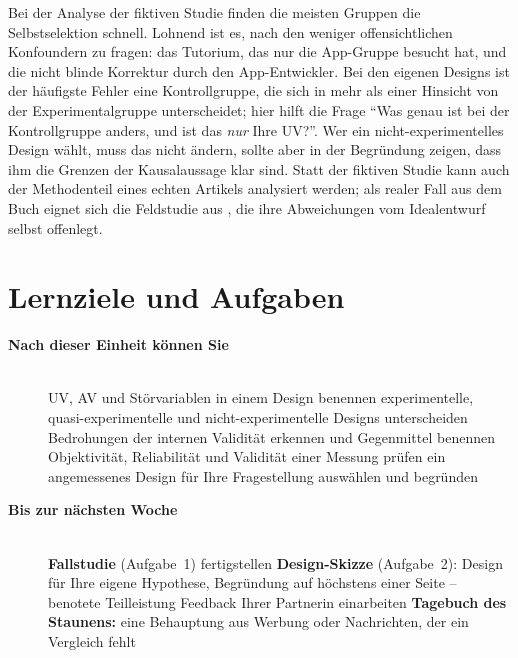 \begin{lehrhinweis}
Bei der Analyse der fiktiven Studie finden die meisten Gruppen die
Selbstselektion schnell. Lohnend ist es, nach den weniger offensichtlichen
Konfoundern zu fragen: das Tutorium, das nur die App-Gruppe besucht hat,
und die nicht blinde Korrektur durch den App-Entwickler. Bei den eigenen
Designs ist der häufigste Fehler eine Kontrollgruppe, die sich in mehr als
einer Hinsicht von der Experimentalgruppe unterscheidet; hier hilft die
Frage \enquote{Was genau ist bei der Kontrollgruppe anders, und ist das
\emph{nur} Ihre UV?}. Wer ein nicht-experimentelles Design wählt, muss das
nicht ändern, sollte aber in der Begründung zeigen, dass ihm die Grenzen
der Kausalaussage klar sind. Statt der fiktiven Studie kann auch der
Methodenteil eines echten Artikels analysiert werden; als realer Fall aus
dem Buch eignet sich die Feldstudie aus , die ihre
Abweichungen vom Idealentwurf selbst offenlegt.
\end{lehrhinweis}

\section{Lernziele und Aufgaben}
\begin{description}
\item[{\rot\bf Nach dieser Einheit können Sie}]~\\[-\lblskip]
\bi
  \ite UV, AV und Störvariablen in einem Design benennen
  \ite experimentelle, quasi-experimentelle und nicht-experimentelle
    Designs unterscheiden
  \ite Bedrohungen der internen Validität erkennen und Gegenmittel
    benennen
  \ite Objektivität, Reliabilität und Validität einer Messung prüfen
  \ite ein angemessenes Design für Ihre Fragestellung auswählen und
    begründen
\ei
\os{\newpage}

\item[{\rot\bf Bis zur nächsten Woche}]~\\[-\lblskip]
\bi
  \ite \textbf{Fallstudie} (Aufgabe~1) fertigstellen
  \ite \textbf{Design-Skizze} (Aufgabe~2): Design für Ihre eigene
    Hypothese, Begründung auf höchstens einer Seite -- benotete
    Teilleistung
  \ite Feedback Ihrer Partnerin einarbeiten
  \ite \textbf{Tagebuch des Staunens:} eine Behauptung aus Werbung oder
    Nachrichten, der ein Vergleich fehlt
\ei
\os{\newpage}
\end{description}

